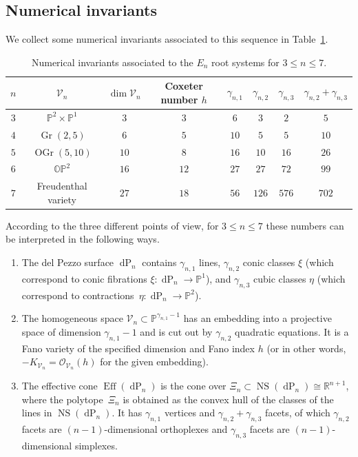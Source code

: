 \documentclass[pdftex]{sigma}
\numberwithin{equation}{section}
\theoremstyle{definition}
\newcommand{\PP}{\mathbb{P}}
\newcommand{\RR}{\mathbb{R}}
\DeclareMathOperator{\Gr}{Gr}
\DeclareMathOperator{\OGr}{OGr}
\DeclareMathOperator{\NS}{NS}
\DeclareMathOperator{\dP}{dP}
\begin{document}
\subsection{Numerical invariants} \label{sect!numerical}
We collect some numerical invariants associated to this sequence in Table~\ref{table!En}.
\begin{table}[htp]
\centering\renewcommand{\arraystretch}{1.2}
\begin{tabular}{|c|c|c|c|cccc|}\hline
$n$ & $\mathcal V_n$ 			& $\dim \mathcal V_n$ & Coxeter number $h$ 	& $\gamma_{n,1}$& $\gamma_{n,2}$& $\gamma_{n,3}$& $\gamma_{n,2}+\gamma_{n,3}$ \\ \hline
$3$ & $\PP^2\times\PP^1$	& $3$	& $3$		& $6$		& $3$		& $2$ & $5$ \\
$4$ & $\Gr(2,5)$		& $6$	& $5$		& $10$		& $5$		& $5$ & $10$ \\
$5$ & $\OGr(5,10)$		& $10$	& $8$		& $16$		& $10$		& $16$ & $26$ \\
$6$ & $\mathbb{OP}^2$	& $16$	& $12$		& $27$		& $27$		& $72$ & $99$ \\
$7$ & Freudenthal variety	& $27$ & $18$	& $56$		& $126$		& $576$ & $702$ \\ \hline
\end{tabular}
\caption{Numerical invariants associated to the $E_n$ root systems for $3\leq n\leq 7$.}\label{table!En}
\end{table}

According to the three different points of view, for $3\leq n\leq 7$ these numbers can be interpreted in the following ways.
\begin{enumerate}\itemsep=0pt
\item[(1)] The del Pezzo surface $\dP_n$ contains $\gamma_{n,1}$ lines, $\gamma_{n,2}$ conic classes $\xi$ \big(which correspond to conic fibrations $\xi\colon\dP_n\to \PP^1$\big), and $\gamma_{n,3}$ cubic classes $\eta$ \big(which correspond to contractions~${\eta\colon\dP_n\to \PP^2}$\big).
\item[(2)] The homogeneous space $\mathcal V_n\subset\PP^{\gamma_{n,1}-1}$ has an embedding into a projective space of dimension $\gamma_{n,1}-1$ and is cut out by $\gamma_{n,2}$ quadratic equations. It is a Fano variety of the specified dimension and Fano index $h$ (or in other words, $-K_{\mathcal V_n}=\mathcal{O}_{\mathcal V_n}(h)$ for the given embedding).
\item[(3)] The effective cone $\operatorname{Eff}(\dP_n)$ is the cone over $\Xi_n\subset \NS(\dP_n)\cong \RR^{n+1}$, where the polytope~$\Xi_n$ is obtained as the convex hull of the classes of the lines in $\NS(\dP_n)$. It has $\gamma_{n,1}$ vertices and $\gamma_{n,2}+\gamma_{n,3}$ facets, of which $\gamma_{n,2}$ facets are $(n-1)$-dimensional orthoplexes and $\gamma_{n,3}$ facets are $(n-1)$-dimensional simplexes.
\end{enumerate}
\end{document}
